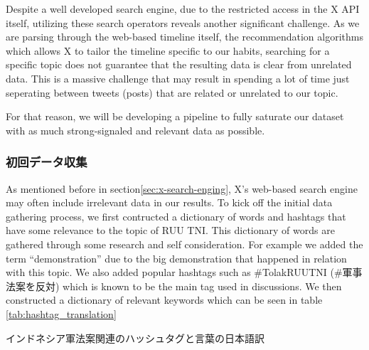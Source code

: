 \documentclass{jabstract}
\begin{document}
\begin{multicols}{2}
Despite a well developed search engine, due to the restricted access in the X API itself, utilizing these search operators reveals another significant challenge. As we are parsing through the web-based timeline itself, the recommendation algorithms which allows X to tailor the timeline specific to our habits, searching for a specific topic does not guarantee that the resulting data is clear from unrelated data. This is a massive challenge that may result in spending a lot of time just seperating between tweets (posts) that are related or unrelated to our topic.

For that reason, we will be developing a pipeline to fully saturate our dataset with as much strong-signaled and relevant data as possible.
\subsubsection{初回データ収集}
As mentioned before in section\ref{sec:x-search-enging}, X's web-based search engine may often include irrelevant data in our results. To kick off the initial data gathering process, we first contructed a dictionary of words and hashtags that have some relevance to the topic of RUU TNI. This dictionary of words are gathered through some research and self consideration. For example we added the term ``demonstration'' due to the big demonstration that happened in relation with this topic. We also added popular hashtags such as \#TolakRUUTNI (\#軍事法案を反対) which is known to be the main tag used in discussions\cite{zuraida2023effectiveness}. We then constructed a dictionary of relevant keywords which can be seen in table \ref{tab:hashtag_translation}
\begin{tablehere}
  \noindent
  \parbox{\linewidth}{
    \centering
    \caption{インドネシア軍法案関連のハッシュタグと言葉の日本語訳}\label{tab:hashtag_translation}
    }
\end{tablehere}
\end{multicols}
\end{document}

